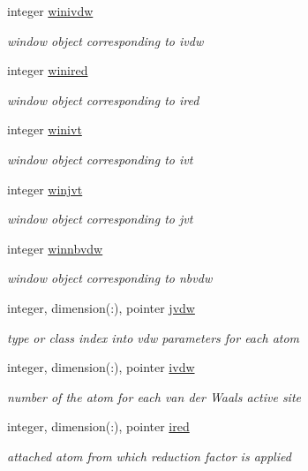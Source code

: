 \begin{DoxyCompactItemize}
integer \hyperlink{classvdw_ab3382a5da536eaf9c75c72b23234c438}{winivdw}
\begin{DoxyCompactList}\small\item\em window object corresponding to ivdw \end{DoxyCompactList}\item 
integer \hyperlink{classvdw_aab00860bd4307394370977abffd67b50}{winired}
\begin{DoxyCompactList}\small\item\em window object corresponding to ired \end{DoxyCompactList}\item 
integer \hyperlink{classvdw_a56c4d404eab08a1617766f8fde8b75cb}{winivt}
\begin{DoxyCompactList}\small\item\em window object corresponding to ivt \end{DoxyCompactList}\item 
integer \hyperlink{classvdw_a9402b47403482ddf1e425de0a0ba6d9c}{winjvt}
\begin{DoxyCompactList}\small\item\em window object corresponding to jvt \end{DoxyCompactList}\item 
integer \hyperlink{classvdw_adbe248422d32ce2af00ba24891cf41b3}{winnbvdw}
\begin{DoxyCompactList}\small\item\em window object corresponding to nbvdw \end{DoxyCompactList}\item 
integer, dimension(\-:), pointer \hyperlink{classvdw_a313a6e8af39ceff2753ec10da53ccde9}{jvdw}
\begin{DoxyCompactList}\small\item\em type or class index into vdw parameters for each atom \end{DoxyCompactList}\item 
integer, dimension(\-:), pointer \hyperlink{classvdw_abb457d49a4b465ca67c7f2611dd88331}{ivdw}
\begin{DoxyCompactList}\small\item\em number of the atom for each van der Waals active site \end{DoxyCompactList}\item 
integer, dimension(\-:), pointer \hyperlink{classvdw_ae2633d0f849d0257b457b77aff4b7fbd}{ired}
\begin{DoxyCompactList}\small\item\em attached atom from which reduction factor is applied \end{DoxyCompactList}\item 

\end{DoxyCompactItemize}

